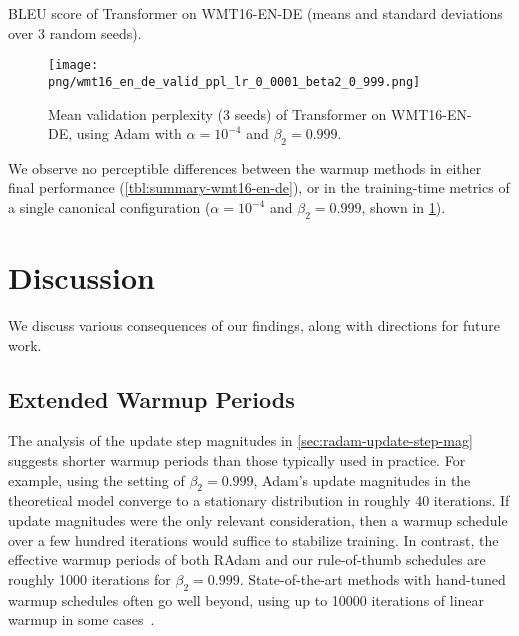 {\begin{table}[ht]
\caption{BLEU score of Transformer on WMT16-EN-DE (means and standard deviations over 3 random seeds).}

\label{tbl:summary-wmt16-en-de}\end{table}

\begin{figure}[ht]
\centering

\captionsetup{
  justification=centering,
  margin=0.1in,
  size=normalsize
}

\texttt{[image: png/wmt16\_en\_de\_valid\_ppl\_lr\_0\_0001\_beta2\_0\_999.png]}
  
\caption{Mean validation perplexity (3 seeds) of Transformer on WMT16-EN-DE, using Adam with $\alpha = 10^{-4}$ and $\beta_2 = 0.999$.}
  
\label{fig:wmt16-en-de-valid-ppl}\end{figure}

We observe no perceptible differences between the warmup methods in either final performance (\cref*{tbl:summary-wmt16-en-de}), or in the training-time metrics of a single canonical configuration ($\alpha=10^{-4}$ and $\beta_2=0.999$, shown in \cref*{fig:wmt16-en-de-valid-ppl}).\section{Discussion}
\label{sec:discussion}

We discuss various consequences of our findings, along with directions for future work.

\subsection{Extended Warmup Periods}

The analysis of the update step magnitudes in \cref*{sec:radam-update-step-mag} suggests shorter warmup periods than those typically used in practice. For example, using the setting of $\beta_2 = 0.999$, Adam's update magnitudes in the theoretical model converge to a stationary distribution in roughly 40 iterations. If update magnitudes were the only relevant consideration, then a warmup schedule over a few hundred iterations would suffice to stabilize training. In contrast, the effective warmup periods of both RAdam and our rule-of-thumb schedules are roughly 1000 iterations for $\beta_2 = 0.999$. State-of-the-art methods with hand-tuned warmup schedules often go well beyond, using up to 10000 iterations of linear warmup in some cases~\citep{liu2019roberta,baevski2018adaptivelm,ott2019fairseq}.

}
